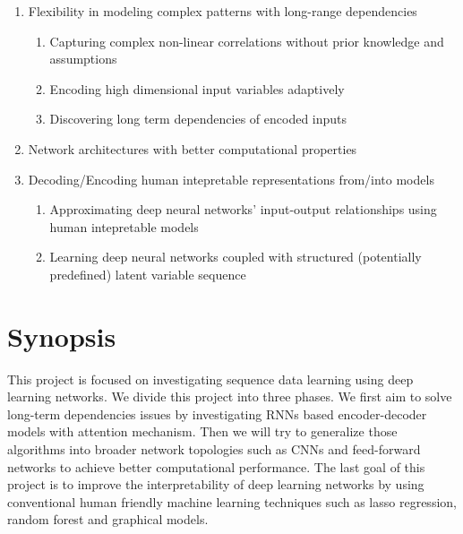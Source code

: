 \message{ !name(usyd_phd_proposal.tex)}\documentclass{article} \usepackage{tabularx}
\begin{document}
\begin{enumerate}
\item Flexibility in modeling complex patterns with long-range
  dependencies
  \begin{enumerate}
  \item Capturing complex non-linear correlations without prior
    knowledge and assumptions
  \item Encoding high dimensional input variables adaptively
  \item Discovering long term dependencies of encoded inputs
  \end{enumerate}
\item Network architectures with better computational properties
\item Decoding/Encoding human intepretable representations
  from/into models
  \begin{enumerate}
  \item Approximating deep neural networks' input-output
    relationships using human intepretable models
  \item Learning deep neural networks coupled with structured
    (potentially predefined) latent variable sequence
  \end{enumerate}
\end{enumerate}

\section{Synopsis}
\label{sec:synop}

This project is focused on investigating sequence data learning
using deep learning networks. We divide this project into three
phases. We first aim to solve long-term dependencies issues by
investigating RNNs based encoder-decoder models with attention
mechanism. Then we will try to generalize those algorithms into
broader network topologies such as CNNs and feed-forward networks
to achieve better computational performance. The last goal of
this project is to improve the interpretability of deep learning
networks by using conventional human friendly machine learning
techniques such as lasso regression, random forest and graphical
models.
\end{document}
